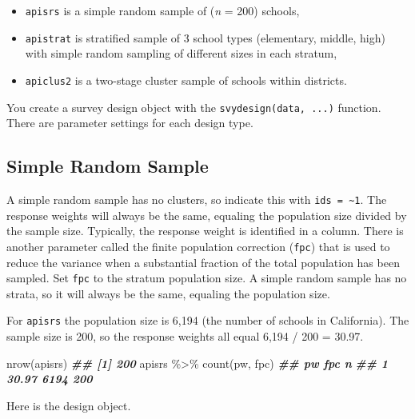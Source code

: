 \documentclass[
]{book}
\newenvironment{Shaded}{\begin{snugshade}}{\end{snugshade}}
\newcommand{\DocumentationTok}[1]{\textcolor[rgb]{0.56,0.35,0.01}{\textbf{\textit{#1}}}}
\newcommand{\FunctionTok}[1]{\textcolor[rgb]{0.00,0.00,0.00}{#1}}
\newcommand{\NormalTok}[1]{#1}
\newcommand{\SpecialCharTok}[1]{\textcolor[rgb]{0.00,0.00,0.00}{#1}}
\providecommand{\tightlist}{%
  \setlength{\itemsep}{0pt}\setlength{\parskip}{0pt}}
\theoremstyle{definition}
\theoremstyle{definition}
\theoremstyle{definition}
\theoremstyle{definition}
\theoremstyle{remark}
\begin{document}
\begin{itemize}
\tightlist
\item
  \texttt{apisrs} is a simple random sample of (\emph{n} = 200) schools,
\item
  \texttt{apistrat} is stratified sample of 3 school types (elementary, middle, high) with simple random sampling of different sizes in each stratum,
\item
  \texttt{apiclus2} is a two-stage cluster sample of schools within districts.
\end{itemize}

You create a survey design object with the \texttt{svydesign(data,\ ...)} function. There are parameter settings for each design type.

\hypertarget{simple-random-sample}{%
\subsection{Simple Random Sample}\label{simple-random-sample}}

A simple random sample has no clusters, so indicate this with \texttt{ids\ =\ \textasciitilde{}1}. The response weights will always be the same, equaling the population size divided by the sample size. Typically, the response weight is identified in a column. There is another parameter called the finite population correction (\texttt{fpc}) that is used to reduce the variance when a substantial fraction of the total population has been sampled. Set \texttt{fpc} to the stratum population size. A simple random sample has no strata, so it will always be the same, equaling the population size.

For \texttt{apisrs} the population size is 6,194 (the number of schools in California). The sample size is 200, so the response weights all equal 6,194 / 200 = 30.97.

\begin{Shaded}
\begin{Highlighting}[]
\FunctionTok{nrow}\NormalTok{(apisrs)}
\DocumentationTok{\#\# [1] 200}
\NormalTok{apisrs }\SpecialCharTok{\%\textgreater{}\%} \FunctionTok{count}\NormalTok{(pw, fpc)}
\DocumentationTok{\#\#      pw  fpc   n}
\DocumentationTok{\#\# 1 30.97 6194 200}
\end{Highlighting}
\end{Shaded}

Here is the design object.
\end{document}
